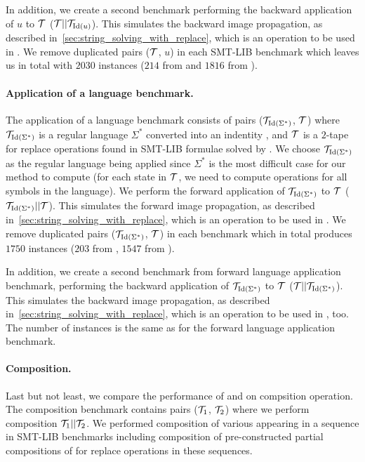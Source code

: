 In addition, we create a second benchmark performing the backward application of $u$ to $\mathcal{T}$ ($ \mathcal{T} || \mathcal{T}_{\text{Id}(u)}$).
This simulates the backward image propagation, as described in~\ref{sec:string_solving_with_replace}, which is an operation to be used in \noodler.
We remove duplicated pairs ($\mathcal{T}$, $u$) in each SMT-LIB benchmark which leaves us in total with $2030$ instances ($214$ from \webapp and $1816$ from \transducerPlus).

\paragraph{Application of a language benchmark.}
The application of a language benchmark consists of pairs ($\mathcal{T}_{\text{Id}(\Sigma^*)}$, $\mathcal{T}$) where $\mathcal{T}_{\text{Id}(\Sigma^*)}$ is a regular language $\Sigma^*$ converted into an indentity \nft, and $\mathcal{T}$ is a $2$-tape \nft for replace operations found in SMT-LIB formulae solved by \noodler.
We choose $\mathcal{T}_{\text{Id}(\Sigma^*)}$ as the regular language being applied since $\Sigma^*$ is the most difficult case for our method to compute (for each state in $\mathcal{T}$, we need to compute operations for all symbols in the language).
We perform the forward application of $\mathcal{T}_{\text{Id}(\Sigma^*)}$ to $\mathcal{T}$ ($\mathcal{T}_{\text{Id}(\Sigma^*)} || \mathcal{T} $).
This simulates the forward image propagation, as described in~\ref{sec:string_solving_with_replace}, which is an operation to be used in \noodler.
We remove duplicated pairs ($\mathcal{T}_{\text{Id}(\Sigma^*)}$, $\mathcal{T}$) in each benchmark which in total produces $1750$ instances ($203$ from \webapp, $1547$ from \transducerPlus).

In addition, we create a second benchmark from forward language application benchmark, performing the backward application of $\mathcal{T}_{\text{Id}(\Sigma^*)}$ to $\mathcal{T}$ ($ \mathcal{T} || \mathcal{T}_{\text{Id}(\Sigma^*)}$).
This simulates the backward image propagation, as described in~\ref{sec:string_solving_with_replace}, which is an operation to be used in \noodler, too.
The number of instances is the same as for the forward language application benchmark.

\paragraph{Composition.}
Last but not least, we compare the performance of \mata and \mona on compsition operation.
The composition benchmark contains pairs ($\mathcal{T}_1$, $\mathcal{T}_2$) where we perform composition $\mathcal{T}_1 || \mathcal{T}_2$.
We performed composition of various \nfts appearing in a sequence in SMT-LIB benchmarks including composition of pre-constructed partial compositions of \nfts for replace operations in these sequences.

